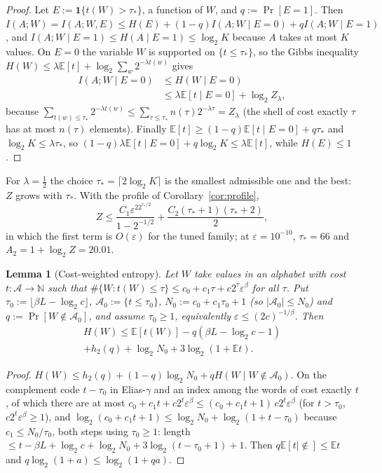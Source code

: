 \documentclass[aps,prx,twocolumn,superscriptaddress,nofootinbib,longbibliography]{revtex4-2}
\theoremstyle{plain}
\newtheorem{lemma}{Lemma}
\theoremstyle{definition}
\theoremstyle{remark}
\newcommand{\E}{\mathbb{E}}
\begin{document}
\begin{proof}
Let $E:=\mathbf1\{t(W)>\tau_*\}$, a function of $W$, and $q:=\Pr[E=1]$. Then $I(A;W)=I(A;W,E)\le H(E)+(1-q)I(A;W\mid E=0)+qI(A;W\mid E=1)$, and $I(A;W\mid E=1)\le H(A\mid E=1)\le\log_2K$ because $A$ takes at most $K$ values. On $E=0$ the variable $W$ is supported on $\{t\le\tau_*\}$, so the Gibbs inequality $H(W)\le\lambda\E[t]+\log_2\sum_w2^{-\lambda t(w)}$ gives
\[\begin{aligned}I(A;W\mid E=0)&\le H(W\mid E=0)\\&\le\lambda\E[t\mid E=0]+\log_2Z_\lambda,\end{aligned}\]
because $\sum_{t(w)\le\tau_*}2^{-\lambda t(w)}\le\sum_{\tau\le\tau_*}n(\tau)2^{-\lambda\tau}=Z_\lambda$ (the shell of cost exactly $\tau$ has at most $n(\tau)$ elements). Finally $\E[t]\ge(1-q)\E[t\mid E=0]+q\tau_*$ and $\log_2K\le\lambda\tau_*$, so $(1-q)\lambda\E[t\mid E=0]+q\log_2K\le\lambda\E[t]$, while $H(E)\le1$.
\end{proof}
For $\lambda=\tfrac12$ the choice $\tau_*=\lceil2\log_2K\rceil$ is the smallest admissible one and the best: $Z$ grows with $\tau_*$. With the profile of Corollary~\ref{cor:profile},
\begin{equation}
Z\le\frac{C_1\varepsilon^22^{\tau_*/2}}{1-2^{-1/2}}+\frac{C_2(\tau_*+1)(\tau_*+2)}2,
\end{equation}
in which the first term is $O(\varepsilon)$ for the tuned family; at $\varepsilon=10^{-10}$, $\tau_*=66$ and $A_2=1+\log_2Z=20.01$.

\begin{lemma}[Cost-weighted entropy]\label{lem:cost}
Let $W$ take values in an alphabet with cost $t:\mathcal A\to\mathbb N$ such that $\#\{W:t(W)\le\tau\}\le c_0+c_1\tau+c2^\tau\varepsilon^\beta$ for all $\tau$. Put $\tau_0:=\lfloor\beta L-\log_2c\rfloor$, $\mathcal A_0:=\{t\le\tau_0\}$, $N_0:=c_0+c_1\tau_0+1$ (so $|\mathcal A_0|\le N_0$) and $q:=\Pr[W\notin\mathcal A_0]$, and assume $\tau_0\ge1$, equivalently $\varepsilon\le(2c)^{-1/\beta}$. Then
\begin{multline}
H(W)\le\E[t(W)]-q(\beta L-\log_2c-1)\\
+h_2(q)+\log_2N_0+3\log_2(1+\E t).
\end{multline}
\end{lemma}
\begin{proof}
$H(W)\le h_2(q)+(1-q)\log_2N_0+qH(W\mid W\notin\mathcal A_0)$. On the complement code $t-\tau_0$ in Elias-$\gamma$ and an index among the words of cost exactly $t$, of which there are at most $c_0+c_1t+c2^t\varepsilon^\beta\le(c_0+c_1t+1)\,c2^t\varepsilon^\beta$ (for $t>\tau_0$, $c2^t\varepsilon^\beta\ge1$), and $\log_2(c_0+c_1t+1)\le\log_2N_0+\log_2(1+t-\tau_0)$ because $c_1\le N_0/\tau_0$, both steps using $\tau_0\ge1$: length $\le t-\beta L+\log_2c+\log_2N_0+3\log_2(t-\tau_0+1)+1$. Then $q\E[t\mid\notin]\le\E t$ and $q\log_2(1+a)\le\log_2(1+qa)$.
\end{proof}
\end{document}
